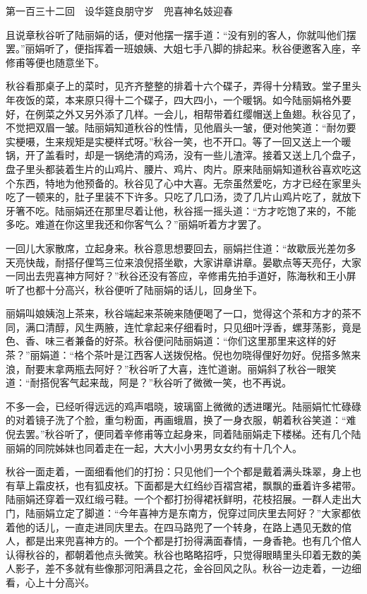 \documentclass[12pt,UTF8]{ctexbook}
\begin{document}
{{{第一百三十二回　设华筵良朋守岁　兜喜神名妓迎春





且说章秋谷听了陆丽娟的话，便对他摆一摆手道：“没有别的客人，你就叫他们摆罢。”丽娟听了，便指挥着一班娘姨、大姐七手八脚的排起来。秋谷便邀客入座，辛修甫等便也随意坐下。

秋谷看那桌子上的菜时，见齐齐整整的排着十六个碟子，弄得十分精致。堂子里头年夜饭的菜，本来原只得十二个碟子，四大四小，一个暖锅。如今陆丽娟格外要好，在例菜之外又另外添了几样。一会儿，相帮带着红缨帽送上鱼翅。秋谷见了，不觉把双眉一皱。陆丽娟知道秋谷的性情，见他眉头一皱，便对他笑道：“耐勿要实梗嗫，生来规矩是实梗样式呀。”秋谷一笑，也不开口。等了一回又送上一个暖锅，开了盖看时，却是一锅绝清的鸡汤，没有一些儿渣滓。接着又送上几个盘子，盘子里头都装着生片的山鸡片、腰片、鸡片、肉片。原来陆丽娟知道秋谷喜欢吃这个东西，特地为他预备的。秋谷见了心中大喜。无奈虽然爱吃，方才已经在家里头吃了一顿来的，肚子里装不下许多。只吃了几口汤，烫了几片山鸡片吃了，就放下牙箸不吃。陆丽娟还在那里尽着让他，秋谷摇一摇头道：“方才吃饱了来的，不能多吃。难道在你这里我还和你客气么？”丽娟听着方才罢了。

一回儿大家散席，立起身来。秋谷意思想要回去，丽娟拦住道：“故歇辰光差勿多天亮快哉，耐搭仔俚笃三位来浪倪搭坐歇，大家讲章讲章。晏歇点等天亮仔，大家一同出去兜喜神方阿好？”秋谷还没有答应，辛修甫先拍手道好，陈海秋和王小屏听了也都十分高兴，秋谷便听了陆丽娟的话儿，回身坐下。

丽娟叫娘姨泡上茶来，秋谷端起来茶碗来随便喝了一口，觉得这个茶和方才的茶不同，满口清醇，风生两腋，连忙拿起来仔细看时，只见细叶浮香，螺芽荡影，竟是色、香、味三者兼备的好茶。秋谷便问陆丽娟道：“你们这里那里来这样的好茶？”丽娟道：“格个茶叶是江西客人送拨倪格。倪也勿晓得俚好勿好。倪搭多煞来浪，耐要末拿两瓶去阿好？”秋谷听了大喜，连忙道谢。丽娟斜了秋谷一眼笑道：“耐搭倪客气起来哉，阿是？”秋谷听了微微一笑，也不再说。

不多一会，已经听得远远的鸡声唱晓，玻璃窗上微微的透进曙光。陆丽娟忙忙碌碌的对着镜子洗了个脸，重匀粉面，再画蛾眉，换了一身衣服，朝着秋谷笑道：“难倪去罢。”秋谷听了，便同着辛修甫等立起身来，同着陆丽娟走下楼梯。还有几个陆丽娟的同院姊妹也同着走在一起，大大小小男男女女约有十几个人。

秋谷一面走着，一面细看他们的打扮：只见他们一个个都是戴着满头珠翠，身上也有草上霜皮袄，也有狐皮袄。下面都是大红绉纱百褶宫裙，飘飘的垂着许多裙带。陆丽娟还穿着一双红缎弓鞋。一个个都打扮得裙袄鲜明，花枝招展。一群人走出大门，陆丽娟立定了脚道：“今年喜神方是东南方，倪穿过同庆里去阿好？”大家都依着他的话儿，一直走进同庆里去。在四马路兜了一个转身，在路上遇见无数的倌人，都是出来兜喜神方的。一个个都是打扮得满面春情，一身香艳。也有几个倌人认得秋谷的，都朝着他点头微笑。秋谷也略略招呼，只觉得眼睛里头印着无数的美人影子，差不多就有些像那河阳满县之花，金谷回风之队。秋谷一边走着，一边细看，心上十分高兴。

}}}
\end{document}
